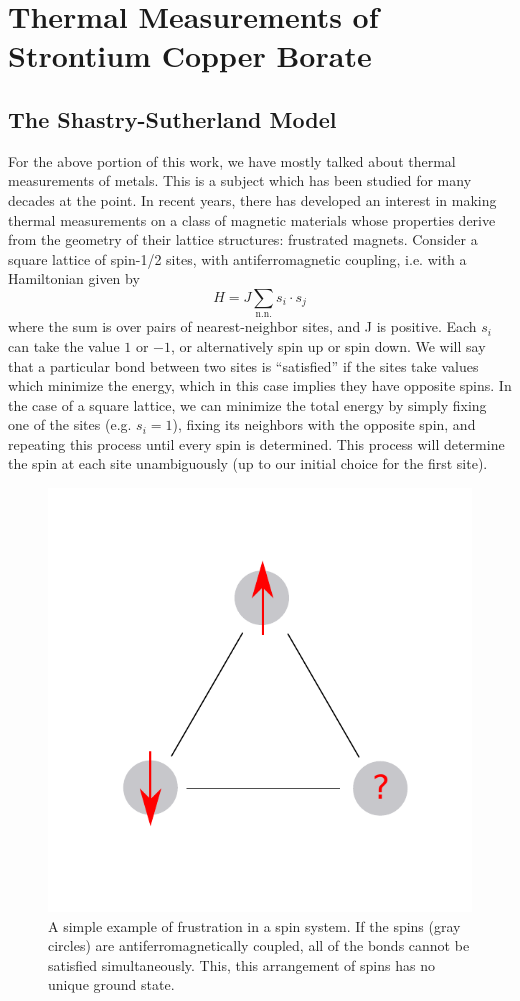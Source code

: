 \documentclass{thesis-umich}
\begin{document}
\chapter{Thermal Measurements of Strontium Copper Borate}

\section{The Shastry-Sutherland Model}
For the above portion of this work, we have mostly talked about thermal measurements of metals. This is a subject which has been studied for many decades at the point. In recent years, there has developed an interest in making thermal measurements on a class of magnetic materials whose properties derive from the geometry of their lattice structures: frustrated magnets. Consider a square lattice of spin-1/2 sites, with antiferromagnetic coupling, i.e. with a Hamiltonian given by
\[ H = J \sum_{\mathrm{n.n.}} s_i \cdot s_j\]
where the sum is over pairs of nearest-neighbor sites, and J is positive. Each $s_i$ can take the value $1$ or $-1$, or alternatively spin up or spin down. We will say that a particular bond between two sites is ``satisfied'' if the sites take values which minimize the energy, which in this case implies they have opposite spins. In the case of a square lattice, we can minimize the total energy by simply fixing one of the sites (e.g. $s_i = 1$), fixing its neighbors with the opposite spin, and repeating this process until every spin is determined. This process will determine the spin at each site unambiguously (up to our initial choice for the first site).
\begin{figure}
	\centering
	\caption[Frustration]{A simple example of frustration in a spin system. If the spins (gray circles) are antiferromagnetically coupled, all of the bonds cannot be satisfied simultaneously. This, this arrangement of spins has no unique ground state.}
	\label{fig:frustration}
	\includegraphics[width=0.6\columnwidth]{figures/frustration.pdf}
\end{figure}
\end{document}
